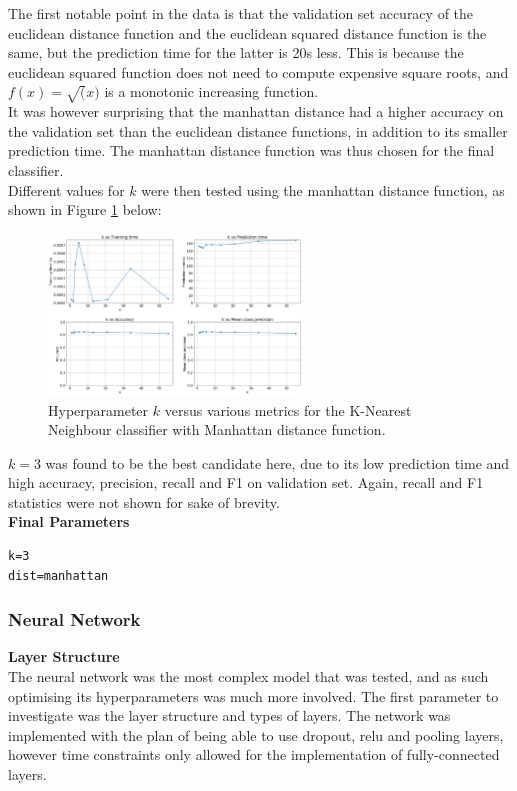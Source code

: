 \documentclass[11pt,a4paper]{article}
\begin{document}
\noindent The first notable point in the data is that the validation set accuracy of the euclidean distance function and the euclidean squared distance function is the same, but the prediction time for the latter is 20s less. This is because the euclidean squared function does not need to compute expensive square roots, and $f(x) = \sqrt(x)$ is a monotonic increasing function.\\

\noindent It was however surprising that the manhattan distance had a higher accuracy on the validation set than the euclidean distance functions, in addition to its smaller prediction time. The manhattan distance function was thus chosen for the final classifier.\\

\noindent Different values for $k$ were then tested using the manhattan distance function, as shown in Figure \ref{fig:knn_k_tuning} below:

\begin{figure}[H]
    \centering
    \includegraphics[width=0.6\textwidth]{img/knn_k_test.png}
    \caption{Hyperparameter $k$ versus various metrics for the K-Nearest Neighbour classifier with Manhattan distance function.}
    \label{fig:knn_k_tuning}
\end{figure}

\noindent $k=3$ was found to be the best candidate here, due to its low prediction time and high accuracy, precision, recall and F1 on validation set. Again, recall and F1 statistics were not shown for sake of brevity.\\

\noindent \textbf{Final Parameters}
\begin{verbatim}
k=3
dist=manhattan
\end{verbatim}

\subsubsection*{Neural Network}
\noindent \textbf{Layer Structure}\\
\noindent The neural network was the most complex model that was tested, and as such optimising its hyperparameters was much more involved. The first parameter to investigate was the layer structure and types of layers. The network was implemented with the plan of being able to use dropout, relu and pooling layers, however time constraints only allowed for the implementation of fully-connected layers.\\
\end{document}

